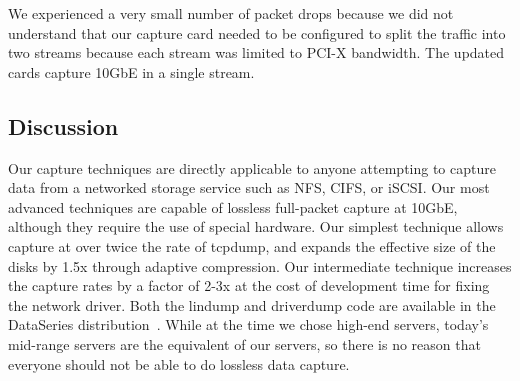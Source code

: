 We experienced a very small number of packet drops because we did not
understand that our capture card needed to be configured to split the
traffic into two streams because each stream was limited to PCI-X
bandwidth.  The updated cards capture 10GbE in a single stream.

\subsection{Discussion}

Our capture techniques are directly applicable to anyone attempting to
capture data from a networked storage service such as NFS, CIFS, or
iSCSI.  Our most advanced techniques are capable of lossless
full-packet capture at 10GbE, although they require the use of special
hardware.  Our simplest technique allows capture at over twice the
rate of tcpdump, and expands the effective size of the disks by 1.5x
through adaptive compression. Our intermediate technique increases the
capture rates by a factor of 2-3x at the cost of development time for
fixing the network driver.  Both the lindump and driverdump code are
available in the DataSeries
distribution~\cite{DSOpenSource}.  While at the time we
chose high-end servers, today's mid-range servers are the equivalent
of our servers, so there is no reason that everyone should not be able
to do lossless data capture.


